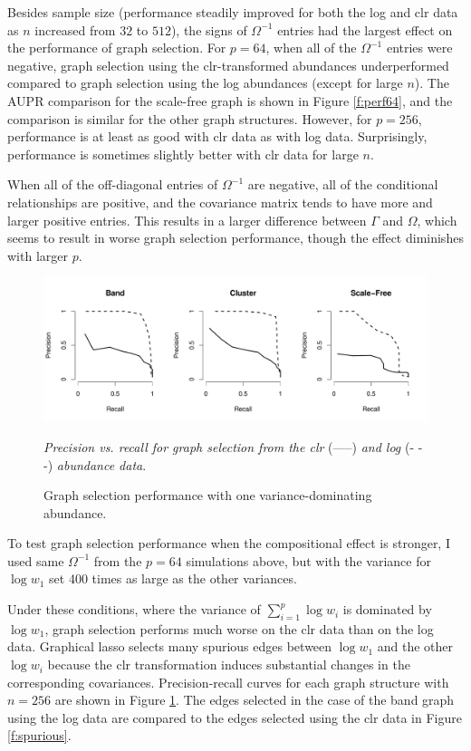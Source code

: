 \documentclass[12pt]{article}
\begin{document}
Besides sample size (performance steadily improved for both the log and clr data as $n$ increased from $32$ to $512$), the signs of $\Omega^{-1}$ entries had the largest effect on the performance of graph selection. For $p = 64$, when all of the $\Omega^{-1}$ entries were negative, graph selection using the clr-transformed abundances underperformed compared to graph selection using the log abundances (except for large $n$). The AUPR comparison for the scale-free graph is shown in Figure \ref{f:perf64}, and the comparison is similar for the other graph structures. However, for $p = 256$, performance is at least as good with clr data as with log data. Surprisingly, performance is sometimes slightly better with clr data for large $n$.

When all of the off-diagonal entries of $\Omega^{-1}$ are negative, all of the conditional relationships are positive, and the covariance matrix tends to have more and larger positive entries. This results in a larger difference between $\Gamma$ and $\Omega$, which seems to result in worse graph selection performance, though the effect diminishes with larger $p$.

\begin{figure}
\caption{Graph selection performance with one variance-dominating abundance.}
\label{f:prcurves}
\begin{center}
\includegraphics[width=6.5in]{figs/var-dom-pr.pdf}
\begin{small}
\textit{Precision vs. recall for graph selection from the clr} (-----) \textit{and log} (- - -) \textit{abundance data}.
\end{small}
\end{center}
\end{figure}

To test graph selection performance when the compositional effect is stronger, I used same $\Omega^{-1}$ from the $p = 64$ simulations above, but with the variance for $\log w_1$ set 400 times as large as the other variances.

Under these conditions, where the variance of $\sum_{i=1}^p \log w_i$ is dominated by $\log w_1$, graph selection performs much worse on the clr data than on the log data. Graphical lasso selects many spurious edges between $\log w_1$ and the other $\log w_i$ because the clr transformation induces substantial changes in the corresponding covariances. Precision-recall curves for each graph structure with $n = 256$ are shown in Figure \ref{f:prcurves}. The edges selected in the case of the band graph using the log data are compared to the edges selected using the clr data in Figure \ref{f:spurious}.
\end{document}
